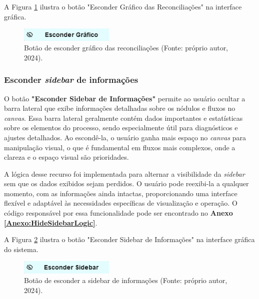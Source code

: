 A Figura \ref{Fig:HideGraphButton} ilustra o botão "Esconder Gráfico das Reconciliações" na interface gráfica.

\begin{figure}[htbp]
    \centering
    \includegraphics[width=0.4\textwidth]{figuras/hide-graphbar-button.png}
    \caption{Botão de esconder gráfico das reconciliações (Fonte: próprio autor, 2024).}
    \label{Fig:HideGraphButton}
\end{figure}

\subsubsection{Esconder \textit{sidebar} de informações}

O botão \textbf{"Esconder Sidebar de Informações"} permite ao usuário ocultar a barra lateral que exibe informações detalhadas sobre os nódulos e fluxos no \textit{canvas}. Essa barra lateral geralmente contém dados importantes e estatísticas sobre os elementos do processo, sendo especialmente útil para diagnósticos e ajustes detalhados. Ao escondê-la, o usuário ganha mais espaço no \textit{canvas} para manipulação visual, o que é fundamental em fluxos mais complexos, onde a clareza e o espaço visual são prioridades.

A lógica desse recurso foi implementada para alternar a visibilidade da \textit{sidebar} sem que os dados exibidos sejam perdidos. O usuário pode reexibi-la a qualquer momento, com as informações ainda intactas, proporcionando uma interface flexível e adaptável às necessidades específicas de visualização e operação. O código responsável por essa funcionalidade pode ser encontrado no \textbf{Anexo \ref{Anexo:HideSidebarLogic}}.

A Figura \ref{Fig:HideSidebarButton} ilustra o botão "Esconder Sidebar de Informações" na interface gráfica do sistema.

\begin{figure}[htbp]
    \centering
    \includegraphics[width=0.4\textwidth]{figuras/hide-sidebar-button.png}
    \caption{Botão de esconder a sidebar de informações (Fonte: próprio autor, 2024).}
    \label{Fig:HideSidebarButton}
\end{figure}


